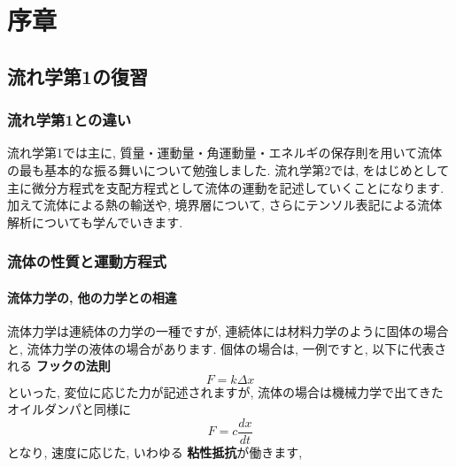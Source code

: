 \documentclass[uplatex,12pt]{jsbook}
\newcommand{\strong}[1]{{\textbf{\color{violet} #1}}}
\begin{document}
\tableofcontents
	\chapter{序章}
	\section{流れ学第1の復習}
	\subsection{流れ学第1との違い}
	流れ学第1では主に, 質量・運動量・角運動量・エネルギの保存則を用いて流体の最も基本的な振る舞いについて勉強しました. 流れ学第2では, \NS{}をはじめとして主に微分方程式を支配方程式として流体の運動を記述していくことになります.加えて流体による熱の輸送や, 境界層について, さらにテンソル表記による流体解析についても学んでいきます.  
	
	\subsection{流体の性質と運動方程式}
	\subsubsection{流体力学の, 他の力学との相違}
	流体力学は連続体の力学の一種ですが, 連続体には材料力学のように固体の場合と, 流体力学の液体の場合があります. 個体の場合は, 一例ですと, 以下に代表される\strong{フックの法則}
	\begin{equation}
		F = k\Delta x
	\end{equation}
	といった, 変位に応じた力が記述されますが, 流体の場合は機械力学で出てきたオイルダンパと同様に
	\begin{equation}
		F = c \frac{dx}{dt}
	\end{equation}
	となり, 速度に応じた, いわゆる\strong{粘性抵抗}が働きます, 
	
\end{document}
